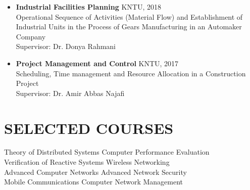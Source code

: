 \documentclass[11pt]{article}
\begin{document}
\begin{itemize}
	
	\item \textbf{Industrial Facilities Planning} \hfill KNTU, 2018\\
	Operational Sequence of Activities (Material Flow) and Establishment of Industrial Units in the Process of Gears Manufacturing in an Automaker Company\\
	Supervisor: Dr. Donya Rahmani
	\href{https://scholar.google.com/citations?user=qUqJT7MAAAAJ&hl=en&oi=ao}{\small \faExternalLink}
	
	\item \textbf{Project Management and Control} \hfill KNTU, 2017\\
	Scheduling, Time management and Resource Allocation in a Construction Project\\
	Supervisor: Dr. Amir Abbas Najafi
	\href{https://scholar.google.com/citations?user=adOQSIEAAAAJ&hl=en&oi=ao}{\small \faExternalLink}
	
	

	
\end{itemize}




\section{SELECTED COURSES}

		Theory of Distributed Systems  \hfill Computer Performance Evaluation\\
		Verification of Reactive Systems    \hspace{41.5mm} Wireless Networking \\
		Advanced Computer Networks \hspace{44.4mm}  Advanced Network Security\\
		Mobile Communications \hspace{56mm}   Computer Network Management
\end{document}
